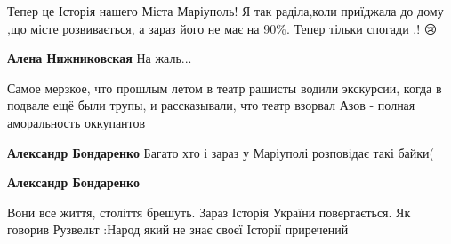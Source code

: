  
 
 
 
 

\qqSecCmt


Тепер це Історія нашего Міста Маріуполь! Я так раділа,коли приїджала до дому
,що місте розвивається, а зараз його не має на 90\%. Тепер тільки спогади .!
😢💛💙💔

\begin{itemize} %
\textbf{Алена Нижниковская} На жаль...
\end{itemize} %


Самое мерзкое, что прошлым летом в театр рашисты водили экскурсии, когда в
подвале ещё были трупы, и рассказывали, что театр взорвал Азов - полная
аморальность оккупантов

\begin{itemize} %
\textbf{Александр Бондаренко} Багато хто і зараз у Маріуполі розповідає такі байки(

\textbf{Александр Бондаренко} 

Вони все життя, століття брешуть. Зараз Історія України повертається. Як
говорив Рузвельт :Народ який не знає своєї Історії приречений

\end{itemize} %
